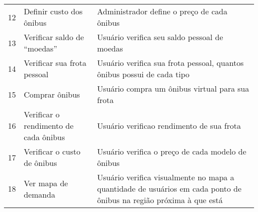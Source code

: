 \begin{table}[H]
\begin{tabular}{lll}
			12 & Definir custo dos ônibus                                   & \begin{minipage}{0.5\textwidth}\espacoVert Administrador define o preço de cada ônibus\end{minipage} \\
			13 & Verificar saldo de “moedas”                                & \begin{minipage}{0.5\textwidth}\espacoVert Usuário verifica seu saldo pessoal de moedas \espacoVert \end{minipage} \\
			14 & Verificar sua frota pessoal                                & \begin{minipage}{0.5\textwidth}\espacoVert Usuário verifica sua frota pessoal, quantos ônibus possui de cada tipo \espacoVert \end{minipage} \\
			15 & Comprar ônibus                                             & Usuário compra um ônibus virtual para sua frota \\
			16 & \begin{minipage}{0.3\textwidth}\espacoVert Verificar o rendimento de cada ônibus \espacoVert \end{minipage}                     & \begin{minipage}{0.5\textwidth}\espacoVert Usuário verificao rendimento de sua frota \espacoVert \end{minipage} \\
			17 & \begin{minipage}{0.3\textwidth}\espacoVert Verificar o custo de ônibus \espacoVert \end{minipage}                  & \begin{minipage}{0.5\textwidth}\espacoVert Usuário verifica o preço de cada modelo de ônibus \espacoVert \end{minipage} \\
			18 & \begin{minipage}{0.3\textwidth}\espacoVert Ver mapa de demanda \espacoVert \end{minipage}                  & \begin{minipage}{0.5\textwidth}\espacoVert Usuário verifica visualmente no mapa a quantidade de usuários em cada ponto de ônibus na região próxima à que está \espacoVert \end{minipage} \\
	    \bottomrule
    \end{tabular}
\end{table}

